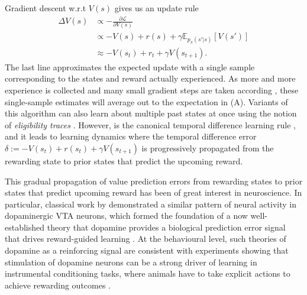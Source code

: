 Gradient descent w.r.t $V(s)$ gives us an update rule
\begin{align}
    \Delta V(s) &\propto - \frac{\partial \mathcal{L}}{\partial V(s)}\\
    \label{eq:TD-learning_exp}
    &\propto - V(s) + r(s) + \gamma \mathbb{E}_{p_\pi(s'|s)} \left [ V(s') \right ]\\
    \label{eq:TD-learning}
    &\approx - V(s_t) + r_t + \gamma V(s_{t+1}).
\end{align}
The last line approximates the expected update with a single sample corresponding to the states and reward actually experienced.
As more and more experience is collected and many small gradient steps are taken according , these single-sample estimates will average out to the expectation in  (A).
Variants of this algorithm can also learn about multiple past states at once using the notion of \emph{eligibility traces} \citep{sutton2018reinforcement}.
However,  is the canonical temporal difference learning rule \citep{sutton1988learning}, and it leads to learning dynamics where the temporal difference error $\delta := - V(s_t) + r(s_t) + \gamma V(s_{t+1})$ is progressively propagated from the rewarding state to prior states that predict the upcoming reward.

This gradual propagation of value prediction errors from rewarding states to prior states that predict upcoming reward has been of great interest in neuroscience.
In particular, classical work by \citet{schultz1997neural} demonstrated a similar pattern of neural activity in dopaminergic VTA neurons, which formed the foundation of a now well-established theory that dopamine provides a biological prediction error signal that drives reward-guided learning \citep{niv2009reinforcement}.
At the behavioural level, such theories of dopamine as a reinforcing signal are consistent with experiments showing that stimulation of dopamine neurons can be a strong driver of learning in instrumental conditioning tasks, where animals have to take explicit actions to achieve rewarding outcomes \citep{olds1954positive, tsai2009phasic}.



